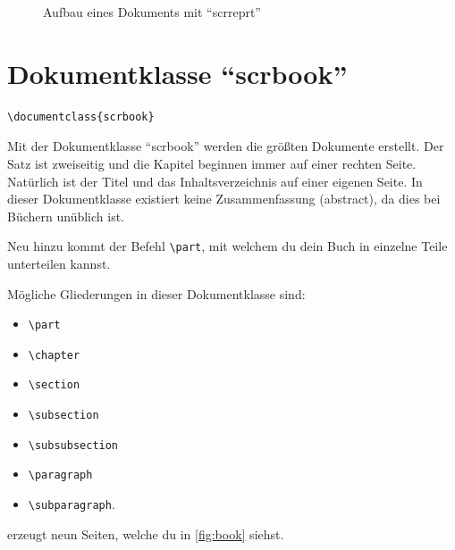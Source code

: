 \begin{figure}[htb]
\begin{center}
	\end{center}
	\caption{Aufbau eines Dokuments mit \enquote{scrreprt}}
	\label{fig:report}
\end{figure}


\section{Dokumentklasse \enquote{scrbook}}

\begin{lstlisting}
\documentclass{scrbook}
\end{lstlisting}

Mit der Dokumentklasse \enquote{scrbook} werden die größten Dokumente erstellt. Der Satz ist zweiseitig und die Kapitel beginnen immer auf einer rechten Seite. Natürlich ist der Titel und das Inhaltsverzeichnis auf einer eigenen Seite. In dieser Dokumentklasse existiert keine Zusammenfassung (abstract), da dies bei Büchern unüblich ist. 

Neu hinzu kommt der Befehl \texttt{\textbackslash part}, mit welchem du dein Buch in einzelne Teile unterteilen kannst.

Mögliche Gliederungen in dieser Dokumentklasse sind:
\begin{itemize}
	\item \texttt{\textbackslash part}
	\item \texttt{\textbackslash chapter}
	\item \texttt{\textbackslash section}
	\item \texttt{\textbackslash subsection}
	\item \texttt{\textbackslash subsubsection}
	\item \texttt{\textbackslash paragraph}
	\item \texttt{\textbackslash subparagraph}.
\end{itemize}

 erzeugt neun Seiten, welche du in \cref{fig:book} siehst.

